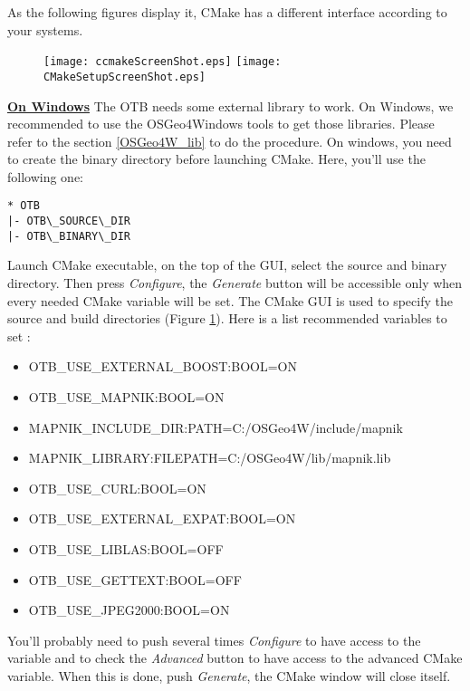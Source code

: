 As the following figures display it, CMake has a different interface according to your systems.
\label{sec:ConfiguringOTBwithVTK}

\begin{figure}[ht]
\centering
\texttt{[image: ccmakeScreenShot.eps]}
\texttt{[image: CMakeSetupScreenShot.eps]}
\label{fig:CMakeGUI}
\end{figure}


\textbf{\underline{On Windows}}
The OTB needs some external library to work. On Windows, we recommended to use the OSGeo4Windows tools to get those libraries. Please refer to the section \ref{OSGeo4W_lib} to do the procedure.
On windows, you need to create the binary directory before launching CMake.
Here, you'll use the following one:
\begin{verbatim}
* OTB
|- OTB\_SOURCE\_DIR 
|- OTB\_BINARY\_DIR
\end{verbatim}

Launch CMake executable, on the top of the GUI, select the source and binary directory.
Then press \emph{Configure}, the \emph{Generate} button will be accessible only when
every needed CMake variable will be set.
The CMake GUI is used to specify the source and build
directories (Figure \ref{fig:CMakeGUI}).
Here is a list recommended variables to set :  
\begin{itemize}
\item OTB\_USE\_EXTERNAL\_BOOST:BOOL=ON
\item OTB\_USE\_MAPNIK:BOOL=ON
\item MAPNIK\_INCLUDE\_DIR:PATH=C:/OSGeo4W/include/mapnik
\item MAPNIK\_LIBRARY:FILEPATH=C:/OSGeo4W/lib/mapnik.lib
\item OTB\_USE\_CURL:BOOL=ON
\item OTB\_USE\_EXTERNAL\_EXPAT:BOOL=ON
\item OTB\_USE\_LIBLAS:BOOL=OFF
\item OTB\_USE\_GETTEXT:BOOL=OFF
\item OTB\_USE\_JPEG2000:BOOL=ON
\end{itemize}

You'll probably need to push several times \emph{Configure} to have access to the variable and to check 
the \emph{Advanced} button to have access to the advanced CMake variable.
When this is done, push \emph{Generate}, the CMake window will close itself.

